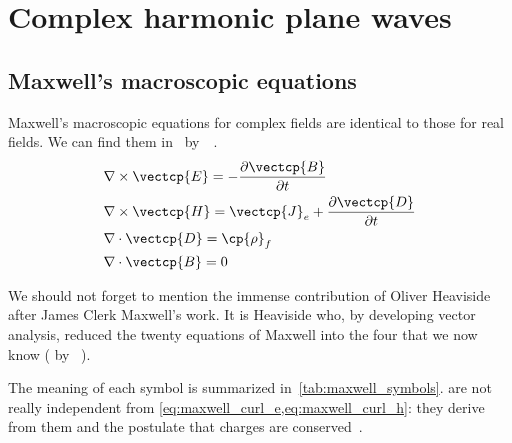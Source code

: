\FloatBarrier
\section{Complex harmonic plane waves}

\subsection{Maxwell's macroscopic equations}

Maxwell's macroscopic equations for complex fields are identical to those for real fields.
We can find them in~ by~\citeauthor{jackson1998classical}~\cite{jackson1998classical}.
\begin{subequations}
    \label{eq:complex_maxwell_macroscopic}
    \begin{align}
        &\nabla \times \vectcp{E} = -\frac{\partial \vectcp{B}}{\partial t}
        \label{eq:maxwell_curl_e}
        \\
        &\nabla \times \vectcp{H} = \vectcp{J}_e + \frac{\partial \vectcp{D}}{\partial t}
        \label{eq:maxwell_curl_h}
        \\
        &\nabla \cdot \vectcp{D}  = \cp{\rho}_f
        \label{eq:maxwell_div_d}
        \\
        &\nabla \cdot \vectcp{B}  = 0
        \label{eq:maxwell_div_b}
    \end{align}
\end{subequations}

We should not forget to mention the immense contribution of Oliver Heaviside after James Clerk Maxwell's work.
It is Heaviside who, by developing vector analysis, reduced the twenty equations of Maxwell into the four that we now know
( by \citeauthor{nahin2002oliver}~\cite{nahin2002oliver}).

The meaning of each symbol is summarized in~\cref{tab:maxwell_symbols}.
 are not really independent from
\cref{eq:maxwell_curl_e,eq:maxwell_curl_h}: they derive from them and the postulate that charges are conserved~\cite{stratton1941electromagnetic}.

